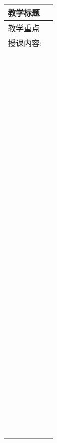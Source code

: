 \documentclass{article}
\begin{document}
    \begin{center}
        \begin{tabular}{|p{}|p{}|}
            \hline
            \multicolumn{1}{|c|}{教学标题} & 
            \,
           
            \\ 
            \hline
            \multicolumn{1}{|c|}{教学重点} & 
            \,
            
            \\
            \hline

            \multicolumn{2}{|l|}{授课内容:} \\
            \multicolumn{2}{|l|}{\,} \\
            \multicolumn{2}{|l|}{\,} \\
            \multicolumn{2}{|l|}{\,} \\
            \multicolumn{2}{|l|}{\,} \\
            \multicolumn{2}{|l|}{\,} \\
            \multicolumn{2}{|l|}{\,} \\
            \multicolumn{2}{|l|}{\,} \\
            \multicolumn{2}{|l|}{\,} \\
            \multicolumn{2}{|l|}{\,} \\
            \multicolumn{2}{|l|}{\,} \\
            \multicolumn{2}{|l|}{\,} \\
            \multicolumn{2}{|l|}{\,} \\
            \multicolumn{2}{|l|}{\,} \\
            \multicolumn{2}{|l|}{\,} \\
            \multicolumn{2}{|l|}{\,} \\
            \multicolumn{2}{|l|}{\,} \\
            \multicolumn{2}{|l|}{\,} \\
            \multicolumn{2}{|l|}{\,} \\
            \multicolumn{2}{|l|}{\,} \\
            \multicolumn{2}{|l|}{\,} \\
            \multicolumn{2}{|l|}{\,} \\
            \multicolumn{2}{|l|}{\,} \\
            \multicolumn{2}{|l|}{\,} \\
            \multicolumn{2}{|l|}{\,} \\
            \multicolumn{2}{|l|}{\,} \\
            \multicolumn{2}{|l|}{\,} \\
            \multicolumn{2}{|l|}{\,} \\


\end{tabular}
\end{center}
\end{document}
